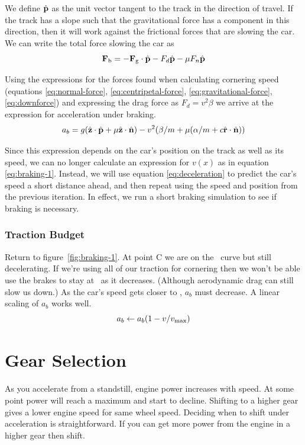 \documentclass{article}
\begin{document}
We define $\hat{\mathbf{p}}$ as the unit vector tangent to the track in the direction
of travel.  If the track has a slope such that the gravitational force has a
component in this direction, then it will work against the frictional forces
that are slowing the car.  We can write the total force slowing the car as
\begin{equation}
  \mathbf{F}_{\mathrm{b}} = -\mathbf{F}_{\mathrm{g}}\cdot\hat{\mathbf{p}} - F_d\hat{\mathbf{p}}
  - \mu F_n \hat{\mathbf{p}}
\end{equation}

Using the expressions for the forces found when calculating cornering speed
(equations \ref{eq:normal-force}, \ref{eq:centripetal-force},
\ref{eq:gravitational-force}, \ref{eq:downforce}) and expressing the drag force
as $F_d = v^2\beta$ we arrive at the expression for acceleration under braking.
\begin{equation}
  \label{eq:deceleration}
  a_b = g(\hat{\mathbf{z}}\cdot\hat{\mathbf{p}} + \mu\hat{\mathbf{z}}\cdot\hat{\mathbf{n}}) 
  - v^2(\beta/m + \mu(\alpha/m + c\hat{\mathbf{r}}\cdot\hat{\mathbf{n}}))
\end{equation}

Since this expression depends on the car's position on the track as well as its
speed, we can no longer calculate an expression for $v(x)$ as in equation
\ref{eq:braking-1}.  Instead, we will use equation \ref{eq:deceleration} to
predict the car's speed a short distance ahead, and then repeat using the speed
and position from the previous iteration.  In effect, we run a short braking
simulation to see if braking is necessary.

\subsubsection{Traction Budget}
Return to figure~\ref{fig:braking-1}.  At point C we are on the \vmax\ curve but
still decelerating.  If we're using all of our traction for cornering then we
won't be able use the brakes to stay at \vmax\ as it decreases.  (Although
aerodynamic drag can still slow us down.)  As the car's speed gets closer to
\vmax, $a_b$ must decrease.  A linear scaling of $a_b$ works well.
\begin{equation}
  a_b \leftarrow a_b (1 - v/v_\mathrm{max})
\end{equation}

\section{Gear Selection}
As you accelerate from a standstill, engine power increases with speed.  At some
point power will reach a maximum and start to decline.  Shifting to a higher
gear gives a lower engine speed for same wheel speed.  Deciding when to shift
under acceleration is straightforward.  If you can get more power from the
engine in a higher gear then shift.
 
\end{document}
